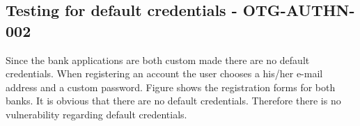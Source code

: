 \subsection{Testing for default credentials - OTG-AUTHN-002}
Since the bank applications are both custom made there are no default credentials. When registering an account the user chooses a his/her e-mail address and a custom password. Figure shows the registration forms for both banks. It is obvious that there are no default credentials. Therefore there is no vulnerability regarding default credentials.
\clearpage